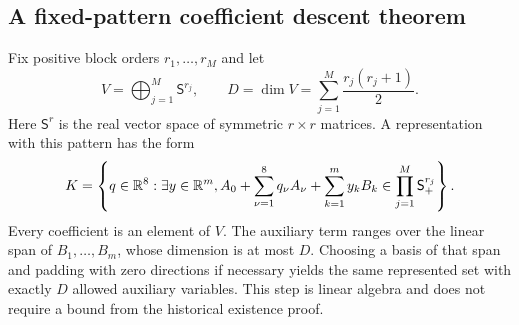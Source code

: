 \subsection{A fixed-pattern coefficient descent theorem}
Fix positive block orders $r_1,\ldots,r_M$ and let
\[
 V=\bigoplus_{j=1}^{M}\mathsf S^{r_j},\qquad
 D=\dim V=\sum_{j=1}^{M}\frac{r_j(r_j+1)}2.
\]
Here $\mathsf S^r$ is the real vector space of symmetric $r\times r$ matrices. A representation with this pattern has the form
\begin{equation}\label{eq:generic-lift}
 K=\left\{q\in\mathbb R^8:\exists y\in\mathbb R^m,
 A_0+\sum_{\nu=1}^{8}q_\nu A_\nu
       +\sum_{k=1}^{m}y_kB_k\in\prod_{j=1}^{M}\mathsf S^{r_j}_+\right\}.
\end{equation}
Every coefficient is an element of $V$. The auxiliary term ranges over the linear span of $B_1,\ldots,B_m$, whose dimension is at most $D$. Choosing a basis of that span and padding with zero directions if necessary yields the same represented set with exactly $D$ allowed auxiliary variables. This step is linear algebra and does not require a bound from the historical existence proof.

